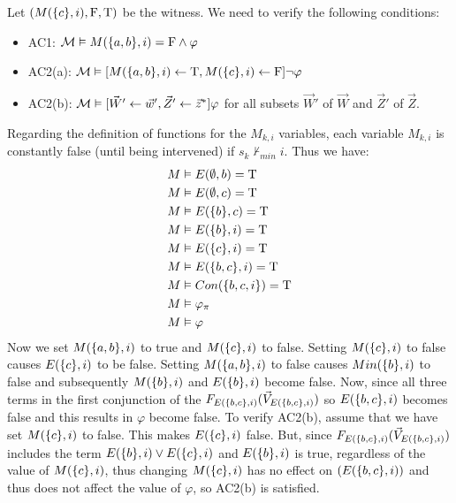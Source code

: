 \begin{example}
    Let $(M(\{c\},i),\mathrm{F},\mathrm{T})$ be the witness.
    We need to verify the following conditions:
    \begin{itemize}
        \item AC1:  $\mathcal{M} \vDash M(\{a,b\},i) = \mathrm{F} \wedge \varphi$
        \item AC2(a): $\mathcal{M}\vDash [M(\{a,b\},i)\leftarrow \mathrm{T},M(\{c\},i)\leftarrow \mathrm{F}] \neg \varphi$
        \item AC2(b): $\mathcal{M} \vDash [\vec W' \leftarrow \vec w', \vec Z' \leftarrow \vec z^* ]\varphi$
              for all subsets
              $\vec W'$ of $\vec W$ and $\vec Z'$ of $\vec Z$.
    \end{itemize}
    Regarding the definition of functions for the $M_{k,i}$ variables,
    each variable $M_{k,i}$ is constantly false (until being intervened)
    if $s_k \not \vdash_{min} i$.
    Thus we have:
    \begin{align*}
        M & \vDash E(\emptyset, b) = \mathrm{T}       \\
        M & \vDash E(\emptyset, c) = \mathrm{T}       \\
        M & \vDash E(\{b\},c) = \mathrm{T}     \\
        M & \vDash E(\{b\},i ) = \mathrm{T}    \\
        M & \vDash E(\{c\},i ) = \mathrm{T}    \\
        M & \vDash E(\{b,c\},i) = \mathrm{T}   \\
        M & \vDash Con(\{b,c,i\}) = \mathrm{T} \\
        M & \vDash \varphi_{\pi}       \\
        M & \vDash \varphi
    \end{align*}
    Now we set $M(\{a,b\},i)$ to true and $M(\{c\},i)$ to false.
    Setting $M(\{c\},i)$ to false causes $E(\{c\},i)$ to be false.
    Setting $M(\{a,b\},i)$ to false causes $Min(\{b\},i)$ to false
    and subsequently $M(\{b\},i)$ and $E(\{b\},i)$ become false.
    Now, since all three terms in the first conjunction of the $F_{E(\{b,c\},i)}(\vec V_{E(\{b,c\},i)})$
    so $E(\{b,c\},i)$ becomes false and this results in $\varphi$ become false.
    To verify AC2(b), assume that we have set $M(\{c\},i)$ to false.
    This makes $E(\{c\},i)$ false.
    But, since $F_{E(\{b,c\},i)}(\vec V_{E(\{b,c\},i)})$ includes the term
    $E(\{b\},i) \vee E(\{c\},i)$ and $E(\{b\},i)$ is true, regardless
    of the value of $M(\{c\},i)$, thus changing $M(\{c\},i)$ has
    no effect on $(E(\{b,c\},i))$ and thus does not affect
    the value of $\varphi$, so AC2(b) is satisfied.
\end{example}

